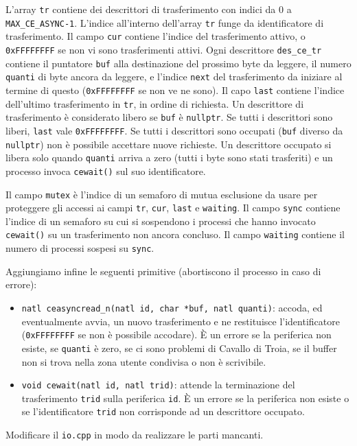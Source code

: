 L'array \verb|tr| contiene dei descrittori di trasferimento
con indici da 0 a \verb|MAX_CE_ASYNC-1|. L'indice all'interno dell'array \verb|tr| funge da identificatore
di trasferimento. Il campo \verb|cur| contiene l'indice del trasferimento attivo, o \verb|0xFFFFFFFF| se
non vi sono trasferimenti attivi. Ogni descrittore \verb|des_ce_tr| contiene il puntatore \verb|buf|
alla destinazione del prossimo byte da leggere, il numero \verb|quanti| di byte ancora da leggere, e l'indice
\verb|next| del trasferimento da iniziare al termine di questo (\verb|0xFFFFFFFF| se non ve ne sono).
Il capo \verb|last| contiene l'indice dell'ultimo trasferimento in \verb|tr|, in ordine di richiesta.
Un descrittore di trasferimento \`e considerato
libero se \verb|buf| \`e \verb|nullptr|. Se tutti i descrittori sono liberi, \verb|last| vale \verb|0xFFFFFFFF|.
Se tutti i descrittori sono occupati (\verb|buf| diverso da \verb|nullptr|) non \`e possibile accettare nuove
richieste. Un descrittore occupato si libera solo quando \verb|quanti| arriva a zero (tutti
i byte sono stati trasferiti) e un processo invoca \verb|cewait()| sul suo identificatore.

Il campo \verb|mutex| \`e l'indice di un semaforo di mutua esclusione da usare per proteggere gli accessi
ai campi \verb|tr|, \verb|cur|, \verb|last| e \verb|waiting|. Il campo \verb|sync| contiene l'indice
di un semaforo su cui si sospendono i processi che hanno invocato \verb|cewait()| su un trasferimento
non ancora concluso. Il campo \verb|waiting| contiene il numero di processi sospesi su \verb|sync|.

Aggiungiamo infine le seguenti primitive (abortiscono il processo in caso di errore):
\begin{itemize}
  \item \verb|natl ceasyncread_n(natl id, char *buf, natl quanti)|: accoda, ed eventualmente avvia, un
  nuovo trasferimento e ne restituisce l'identificatore (\verb|0xFFFFFFFF| se non \`e possibile accodare).
  \`E un errore se la periferica non esiste, se \verb|quanti| \`e zero, se ci sono problemi di Cavallo 
  di Troia, se il buffer non si trova nella zona utente condivisa o non \`e scrivibile.
  \item \verb|void cewait(natl id, natl trid)|: attende la terminazione del trasferimento \verb|trid|
  sulla periferica \verb|id|. \`E un errore se la periferica non esiste o se l'identificatore \verb|trid|
  non corrisponde ad un descrittore occupato.
\end{itemize}

Modificare il \verb|io.cpp| in modo da realizzare le parti mancanti.
